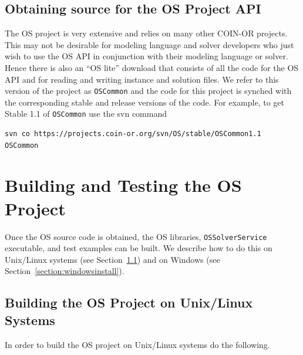 \documentclass[11pt]{article}
\renewcommand{\_}{{\char"5F}}
\renewcommand{\{}{{\char"7B}}
\renewcommand{\}}{{\char"7D}}
\renewcommand{\^}{{\char"0D}}
\renewcommand{\'}{{\char"0D}}
\begin{document}
\subsection{Obtaining source for the OS Project API} \label{section:oslite}
The OS project is very extensive and relies on many other COIN-OR projects.  
This may not be desirable for modeling language and solver developers who just wish to use the OS API 
in conjunction with their modeling language or solver.  Hence there is also an ``OS lite'' download 
that consists of all the code for the OS API and for reading and writing instance and solution files. 
We refer to this version of the project as {\tt OSCommon} and the code 
for this project is synched with the corresponding stable and release versions of the code. 
For example, to get Stable 1.1 of {\tt OSCommon} use the svn command
\begin{verbatim}
svn co https://projects.coin-or.org/svn/OS/stable/OSCommon1.1  OSCommon
\end{verbatim}


\section{Building and Testing the OS Project}\label{section:build}


Once the OS source code is obtained, the OS libraries, {\tt OSSolverService} executable, and test examples can be built.  
We describe how to do this on Unix/Linux systems (see Section~\ref{section:unixbuilds})  
and on Windows (see Section~\ref{section:windowsinstall}).

\subsection{Building the OS Project on Unix/Linux Systems}\label{section:unixbuilds}

In order to build the OS project on Unix/Linux systems do the following.

\vskip 8pt
\end{document}
